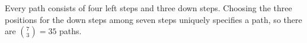 Every path consists of four left steps and three down steps. Choosing the three positions for the down steps among seven steps uniquely specifies a path, so there are $\binom73=\boxed{35}$ paths.
